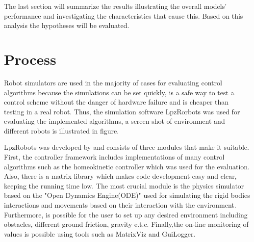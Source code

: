 \documentclass[msc,ai,logo]{infthesis}
\begin{document}
The last section will summarize the results illustrating the overall models' performance and investigating the characteristics that cause this. Based on this analysis the hypotheses will be evaluated.            
\label{ch::ev}

\section{Process}
 Robot simulators are used in the majority of cases for evaluating control algorithms because the simulations can be set quickly, is a safe way to test a control scheme without the danger of hardware failure and is cheaper than testing in a real robot. Thus, the simulation software LpzRorbots was used for evaluating the implemented algorithms, a screen-shot of environment and different robots is illustrated in figure.
 
LpzRobots was developed by \cite{lpzrobots} and consists of three modules that make it suitable. First, the controller framework includes implementations of many control algorithms such as the homeokinetic controller which was used for the evaluation. Also, there is a matrix library which makes code development easy and clear, keeping the running time low. The most crucial module is the physics simulator based on the "Open Dynamics Engine(ODE)" used for simulating the rigid bodies interactions and movements based on their interaction with the environment. Furthermore, is possible for the user to set up any desired environment including obstacles, different ground friction, gravity e.t.c. Finally,the on-line monitoring of values is possible using tools such as MatrixViz and GuiLogger.  
\end{document}
